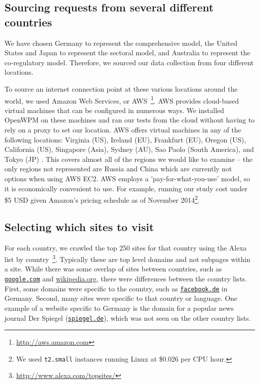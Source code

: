 \documentclass[conference]{IEEEtran}
\begin{document}
\subsection{Sourcing requests from several different countries}

We have chosen Germany to represent the comprehensive model, the United States and Japan to represent the sectoral model, and Australia to represent the co-regulatory model. Therefore, we sourced our data collection from four different locations.

To source an internet connection point at these various locations around the world, we used Amazon Web Services, or AWS~\footnote{\url{http://aws.amazon.com}}. AWS provides cloud-based virtual machines that can be configured in numerous ways. We installed OpenWPM on these machines and ran our tests from the cloud without having to rely on a proxy to set our location. AWS offers virtual machines in any of the following locations: Virginia (US), Ireland (EU), Frankfurt (EU), Oregon (US), California (US), Singapore (Asia), Sydney (AU), Sao Paolo (South America), and Tokyo (JP) \cite{amazonregion}. This covers almost all of the regions we would like to examine -- the only regions not represented are Russia and China which are currently not options when using AWS EC2. AWS employs a 'pay-for-what-you-use' model, so it is economically convenient to use. For example, running our study cost under \$5 USD given Amazon's pricing schedule as of November 2014\footnote{We used \texttt{t2.small} instances running Linux at \$0.026 per CPU hour.}.


\subsection{Selecting which sites to visit}

For each country, we crawled the top 250 sites for that country using the Alexa list by country~\footnote{\url{http://www.alexa.com/topsites/}}. Typically these are top level domains and not subpages within a site. While there was some overlap of sites between countries, such as \texttt{\url{google.com}} and \url{wikipedia.org}, there were differences between the country lists.  First, some domains were specific to the country, such as \texttt{\url{facebook.de}} in Germany.  Second, many sites were specific to that country or language.  One example of a website specific to Germany is the domain for a popular news journal Der Spiegel (\texttt{\url{spiegel.de}}), which was not seen on the other country lists.  
\end{document}
